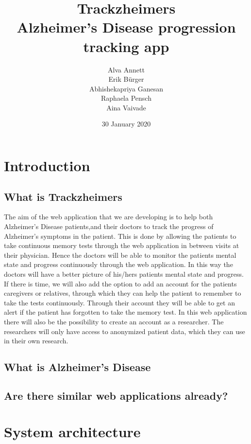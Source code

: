 \documentclass{article}
\title{%
  Trackzheimers \\
  \large  Alzheimer’s Disease progression tracking app}
\author{Alva Annett\\Erik Bürger \\ Abhishekapriya Ganesan\\Raphaela Pensch\\Aina Vaivade}
\date{30 January 2020}
\begin{document}
\maketitle

\section{Introduction}
\subsection{What is Trackzheimers}
The aim of the web application that we are developing is to help both Alzheimer's Disease patients,and their doctors to track the progress of Alzheimer's symptoms in the patient. This is done by allowing the patients to take continuous memory tests through the web application in between visits at their physician. Hence the doctors will be able to monitor the patients mental state and progress continuously through the web application. In this way the doctors will have a better picture of his/hers patients mental state and progress.\newline
\newline If there is time, we will also add the option to add an account for the patients caregivers or relatives, through which they can help the patient to remember to take the tests continuously. Through their account they will be able to get an alert if the patient has forgotten to take the memory test.\newline
\newline In this web application there will also be the possibility to create an account as a researcher. The researchers will only have access to anonymized patient data, which they can use in their own research. %

\subsection{What is Alzheimer's Disease}

\subsection{Are there similar web applications already?}

\section{System architecture}




\end{document}
